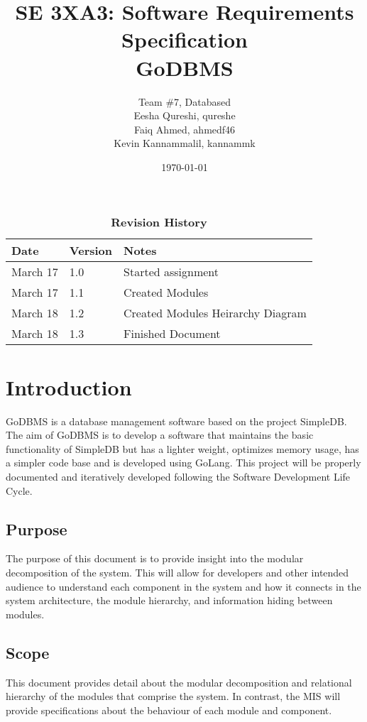 \documentclass[12pt, titlepage]{article}
\title{SE 3XA3: Software Requirements Specification\\GoDBMS}
\author{Team \#7, Databased
		\\ Eesha Qureshi, qureshe 
		\\ Faiq Ahmed, ahmedf46 
		\\ Kevin Kannammalil, kannammk
}
\date{\today}
\begin{document}
\maketitle

\tableofcontents
\listoftables
\listoffigures

\begin{table}[H]
\caption{\bf Revision History}
\begin{tabularx}{\textwidth}{p{3cm}p{2cm}X}
\toprule {\bf Date} & {\bf Version} & {\bf Notes}\\
\midrule
March 17 & 1.0 & Started assignment\\
March 17 & 1.1 & Created Modules\\
March 18 & 1.2 & Created Modules Heirarchy Diagram\\
March 18 & 1.3 & Finished Document\\
\bottomrule
\end{tabularx}
\end{table}

\newpage


\section{Introduction}

GoDBMS is a database management software based on the project SimpleDB. The aim of GoDBMS is to develop a software that maintains the basic functionality of SimpleDB but has a lighter weight, optimizes memory usage, has a simpler code base and is developed using GoLang. This project will be properly documented and iteratively developed following the Software Development Life Cycle.

\subsection{Purpose}

The purpose of this document is to provide insight into the modular decomposition of the system. This will allow for developers and other intended audience to understand each component in the system and how it connects in the system architecture, the module hierarchy, and information hiding between modules. 

\subsection{Scope}
This document provides detail about the modular decomposition and relational hierarchy of the modules that comprise the system. In contrast, the MIS will provide specifications about the behaviour of each module and component.
\end{document}
